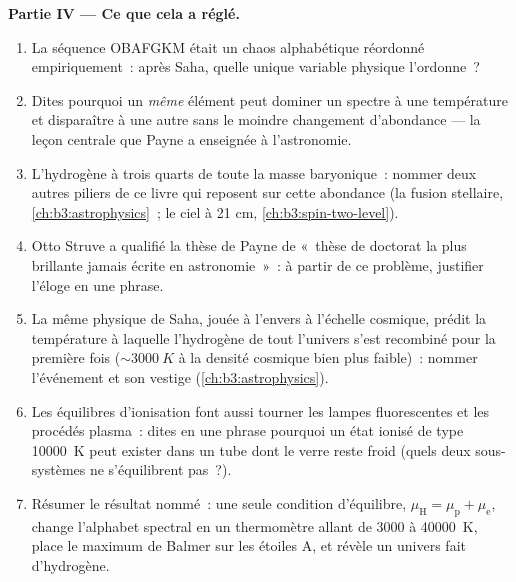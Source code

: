 \begin{problem}
\medskip\noindent\textbf{Partie IV --- Ce que cela a réglé.}
\begin{enumerate}[resume]
  \item La séquence OBAFGKM était un chaos alphabétique réordonné
        empiriquement~: après Saha, quelle unique variable physique
        l'ordonne~?
  \item Dites pourquoi un \emph{même} élément peut dominer un spectre
        à une température et disparaître à une autre sans le moindre
        changement d'abondance --- la leçon centrale que Payne a
        enseignée à l'astronomie.
  \item L'hydrogène à trois quarts de toute la masse baryonique~:
        nommer deux autres piliers de ce livre qui reposent sur cette
        abondance (la fusion stellaire, \cref{ch:b3:astrophysics}~; le
        ciel à 21 cm, \cref{ch:b3:spin-two-level}).
  \item Otto Struve a qualifié la thèse de Payne de «~thèse de
        doctorat la plus brillante jamais écrite en astronomie~»~: à
        partir de ce problème, justifier l'éloge en une phrase.
  \item La même physique de Saha, jouée à l'envers à l'échelle
        cosmique, prédit la température à laquelle l'hydrogène de tout
        l'univers s'est recombiné pour la première fois
        ($\sim\qty{3000}{K}$ à la densité cosmique bien plus faible)~:
        nommer l'événement et son vestige
        (\cref{ch:b3:astrophysics}).
  \item Les équilibres d'ionisation font aussi tourner les lampes
        fluorescentes et les procédés plasma~: dites en une phrase
        pourquoi un état ionisé de type \qty{10000}{K} peut exister
        dans un tube dont le verre reste froid (quels deux
        sous-systèmes ne s'équilibrent pas~?).
  \item Résumer le résultat nommé~: une seule condition d'équilibre,
        $\mu_{\text{H}} = \mu_{\text{p}} + \mu_{\text{e}}$, change
        l'alphabet spectral en un thermomètre allant de $3000$ à
        \qty{40000}{K}, place le maximum de Balmer sur les étoiles A,
        et révèle un univers fait d'hydrogène.
\end{enumerate}
\end{problem}
